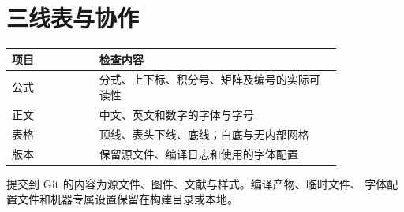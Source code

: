 \documentclass[UTF8,fontset=none,zihao=5]{ctexart}
\begin{document}
\clearpage
\section{三线表与协作}
\begin{reporttable}
\caption{排版检查项目}
\begin{tabular}{p{0.22\linewidth}p{0.61\linewidth}}
\toprule
项目 & 检查内容\\
\midrule
公式 & 分式、上下标、积分号、矩阵及编号的实际可读性\\
正文 & 中文、英文和数字的字体与字号\\
表格 & 顶线、表头下线、底线；白底与无内部网格\\
版本 & 保留源文件、编译日志和使用的字体配置\\
\bottomrule
\end{tabular}
\end{reporttable}

提交到 Git 的内容为源文件、图件、文献与样式。编译产物、临时文件、
字体配置文件和机器专属设置保留在构建目录或本地。
\end{document}
